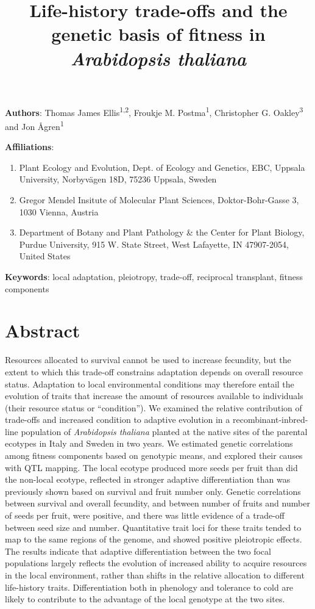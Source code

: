 \documentclass[]{article}
\title{Life-history trade-offs and the genetic basis of fitness in \emph{Arabidopsis thaliana}}
\author{}
\date{\vspace{-2.5em}}
\providecommand{\tightlist}{%
  \setlength{\itemsep}{0pt}\setlength{\parskip}{0pt}}
\begin{document}
\maketitle

\textbf{Authors}: Thomas James Ellis\textsuperscript{1,2}, Froukje M. Postma\textsuperscript{1}, Christopher G. Oakley\textsuperscript{3} and Jon Ågren\textsuperscript{1}

\textbf{Affiliations}:

\begin{enumerate}
\def\labelenumi{\arabic{enumi}.}
\tightlist
\item
  Plant Ecology and Evolution, Dept. of Ecology and Genetics, EBC, Uppsala University, Norbyvägen 18D, 75236 Uppsala, Sweden
\item
  Gregor Mendel Insitute of Molecular Plant Sciences, Doktor-Bohr-Gasse 3, 1030 Vienna, Austria
\item
  Department of Botany and Plant Pathology \& the Center for Plant Biology, Purdue University, 915 W. State Street, West Lafayette, IN 47907-2054, United States
\end{enumerate}

\textbf{Keywords}: local adaptation, pleiotropy, trade-off, reciprocal transplant, fitness components

\newpage

\hypertarget{abstract}{%
\section{Abstract}\label{abstract}}

Resources allocated to survival cannot be used to increase fecundity, but the extent to which this trade-off constrains adaptation depends on overall resource status. Adaptation to local environmental conditions may therefore entail the evolution of traits that increase the amount of resources available to individuals (their resource status or ``condition''). We examined the relative contribution of trade-offs and increased condition to adaptive evolution in a recombinant-inbred-line population of \emph{Arabidopsis thaliana} planted at the native sites of the parental ecotypes in Italy and Sweden in two years. We estimated genetic correlations among fitness components based on genotypic means, and explored their causes with QTL mapping. The local ecotype produced more seeds per fruit than did the non-local ecotype, reflected in stronger adaptive differentiation than was previously shown based on survival and fruit number only. Genetic correlations between survival and overall fecundity, and between number of fruits and number of seeds per fruit, were positive, and there was little evidence of a trade-off between seed size and number. Quantitative trait loci for these traits tended to map to the same regions of the genome, and showed positive pleiotropic effects. The results indicate that adaptive differentiation between the two focal populations largely reflects the evolution of increased ability to acquire resources in the local environment, rather than shifts in the relative allocation to different life-history traits. Differentiation both in phenology and tolerance to cold are likely to contribute to the advantage of the local genotype at the two sites.
\end{document}
